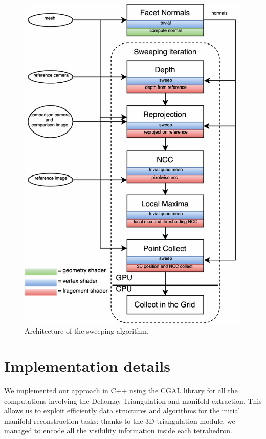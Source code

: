 \begin{figure}[tp]
\centering
\includegraphics[height=0.92\textheight]{./img/ch-sweep/Sweep-shaders-architecture}
\caption{Architecture of the sweeping algorithm.}
\label{fig:sweep-arch}
\end{figure}

\section{Implementation details}
We implemented our approach in C++ using the CGAL library \cite{cgal} for all the computations involving the Delaunay Triangulation and manifold extraction. This allows us to exploit efficiently data structures and algorithms for the initial manifold reconstruction tasks: thanks to the 3D triangulation module, we managed to encode all the visibility information inside each tetrahedron.

